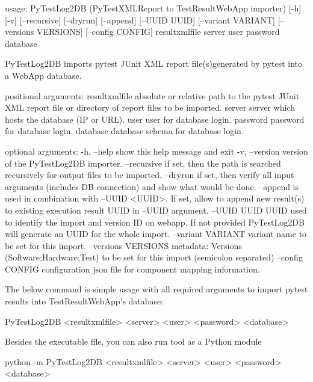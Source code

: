 \begin{robotlog}
usage: PyTestLog2DB (PyTestXMLReport to TestResultWebApp importer) [-h] [-v]
                    [--recursive] [--dryrun] [--append] [--UUID UUID]
                    [--variant VARIANT] [--versions VERSIONS] [--config CONFIG]
                    resultxmlfile server user password database

PyTestLog2DB imports pytest JUnit XML report file(s)generated by pytest into a WebApp database.

positional arguments:
resultxmlfile        absolute or relative path to the pytest JUnit XML report
                     file or directory of report files to be imported.
server               server which hosts the database (IP or URL).
user                 user for database login.
password             password for database login.
database             database schema for database login.

optional arguments:
-h, --help           show this help message and exit
-v, --version        version of the PyTestLog2DB importer.
--recursive          if set, then the path is searched recursively for output
                     files to be imported.
--dryrun             if set, then verify all input arguments (includes DB connection)
                     and show what would be done.
--append             is used in combination with --UUID <UUID>. If set, allow to append
                     new result(s) to existing execution result UUID in --UUID argument.
--UUID UUID          UUID used to identify the import and version ID on webapp.
                     If not provided PyTestLog2DB will generate an UUID for the whole import.
--variant VARIANT    variant name to be set for this import.
--versions VERSIONS  metadata: Versions (Software;Hardware;Test) to be set for this import 
                     (semicolon separated)
--config CONFIG      configuration json file for component mapping information.
\end{robotlog}

    The below command is simple usage with all required arguments to import
    pytest results into TestResultWebApp's database:

\begin{robotlog}
PyTestLog2DB <resultxmlfile> <server> <user> <password> <database>
\end{robotlog}

    Besides the executable file, you can also run tool as a Python module

\begin{robotlog}
python -m PyTestLog2DB <resultxmlfile> <server> <user> <password> <database>
\end{robotlog}

